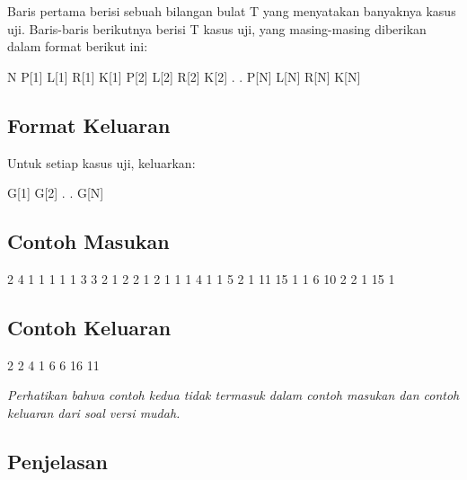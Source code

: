 \documentclass[../main_problemset.tex]{subfiles} %
\begin{document}
Baris pertama berisi sebuah bilangan bulat T yang menyatakan banyaknya kasus uji. Baris-baris berikutnya berisi T kasus uji, yang masing-masing diberikan dalam format berikut ini:

\begin{lcverbatim}
N
P[1] L[1] R[1] K[1]
P[2] L[2] R[2] K[2]
.
.
P[N] L[N] R[N] K[N]
\end{lcverbatim}

\subsection*{Format Keluaran}

Untuk setiap kasus uji, keluarkan:

\begin{lcverbatim}
G[1]
G[2]
.
.
G[N]
\end{lcverbatim}

\vspace{.4cm}

\begin{minipage}[t]{0.5\textwidth}
\subsection*{Contoh Masukan}

\begin{lcverbatim}
2
4
1 1 1 1
1 3 3 2
1 2 2 1
2 1 1 1
4
1 1 5 2
1 11 15 1
1 6 10 2
2 1 15 1
\end{lcverbatim}
\end{minipage}
\begin{minipage}[t]{0.5\textwidth}
\subsection*{Contoh Keluaran}

\begin{lcverbatim}
2
2
4
1
6
6
16
11
\end{lcverbatim}
\end{minipage}

\textit{Perhatikan bahwa contoh kedua tidak termasuk dalam contoh masukan dan contoh keluaran dari soal versi mudah.}

\subsection*{Penjelasan}
\end{document}
